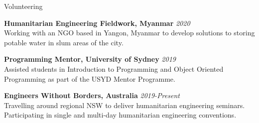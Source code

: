 \documentclass{resume} %
\begin{document}
\begin{rSection}{Volunteering}

{\bf Humanitarian Engineering Fieldwork, Myanmar} \hfill {\em 2020}
\\Working with an NGO based in Yangon, Myanmar to develop solutions to storing potable water in slum areas of the city.

{\bf Programming Mentor, University of Sydney} \hfill {\em 2019}
\\Assisted students in Introduction to Programming and Object Oriented Programming as part of the USYD Mentor Programme.

{\bf Engineers Without Borders, Australia} \hfill {\em 2019-Present}
\\Travelling around regional NSW to deliver humanitarian engineering seminars. Participating in single and multi-day humanitarian engineering conventions.

\end{rSection}
\end{document}
